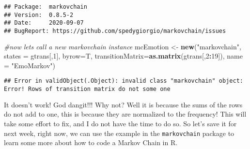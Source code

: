 \documentclass[
]{article}
\newenvironment{Shaded}{\begin{snugshade}}{\end{snugshade}}
\newcommand{\CommentTok}[1]{\textcolor[rgb]{0.56,0.35,0.01}{\textit{#1}}}
\newcommand{\DataTypeTok}[1]{\textcolor[rgb]{0.13,0.29,0.53}{#1}}
\newcommand{\DecValTok}[1]{\textcolor[rgb]{0.00,0.00,0.81}{#1}}
\newcommand{\KeywordTok}[1]{\textcolor[rgb]{0.13,0.29,0.53}{\textbf{#1}}}
\newcommand{\NormalTok}[1]{#1}
\newcommand{\OperatorTok}[1]{\textcolor[rgb]{0.81,0.36,0.00}{\textbf{#1}}}
\newcommand{\StringTok}[1]{\textcolor[rgb]{0.31,0.60,0.02}{#1}}
\begin{document}
\begin{verbatim}
## Package:  markovchain
## Version:  0.8.5-2
## Date:     2020-09-07
## BugReport: https://github.com/spedygiorgio/markovchain/issues
\end{verbatim}

\begin{Shaded}
\begin{Highlighting}[]
\CommentTok{#now lets call a new markovchain instance}
\NormalTok{mcEmotion <-}\StringTok{  }\KeywordTok{new}\NormalTok{(}\StringTok{"markovchain"}\NormalTok{, }\DataTypeTok{states =}\NormalTok{ gtrans[,}\DecValTok{1}\NormalTok{], }\DataTypeTok{byrow=}\NormalTok{T, }\DataTypeTok{transitionMatrix=}\KeywordTok{as.matrix}\NormalTok{(gtrans[,}\DecValTok{2}\OperatorTok{:}\DecValTok{19}\NormalTok{]), }\DataTypeTok{name =} \StringTok{"EmoMarkov"}\NormalTok{)}
\end{Highlighting}
\end{Shaded}

\begin{verbatim}
## Error in validObject(.Object): invalid class "markovchain" object: Error! Rows of transition matrix do not some one
\end{verbatim}

It doesn't work! God dangit!!! Why not? Well it is because the sums of
the rows do not add to one, this is because they are normalized to the
frequency! This will take some effort to fix, and I do not have the time
to do so. So let's save it for next week, right now, we can use the
example in the \texttt{markovchain} package to learn some more about how
to code a Markov Chain in R.
\end{document}
